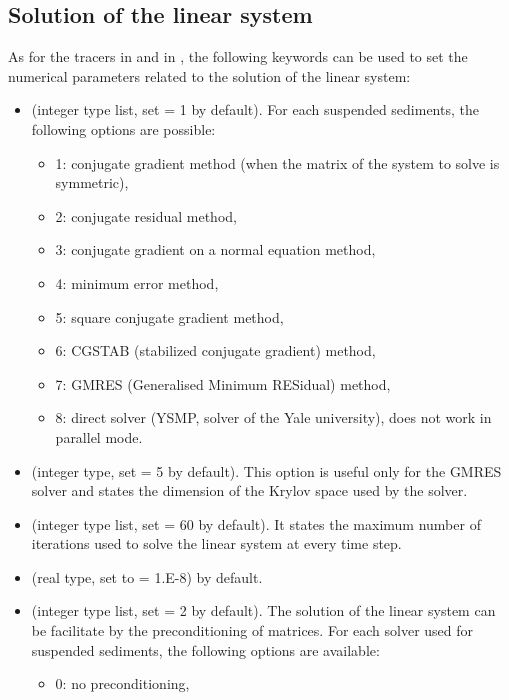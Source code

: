 \subsection{Solution of the linear system}
As for the tracers in  and in , the following
keywords can be used to set the numerical parameters related to the solution
 of the linear system:
\begin{itemize}
\item {} (integer type list, set
{\ttfamily = 1} by default). For each suspended sediments, the following
options are possible:
 \begin{itemize}
\item 1: conjugate gradient method (when the matrix of the system to solve
is symmetric),

\item 2: conjugate residual method,

\item 3: conjugate gradient on a normal equation method,

\item 4: minimum error method,

\item 5: square conjugate gradient method,

\item 6: CGSTAB (stabilized conjugate gradient) method,

\item 7: GMRES (Generalised Minimum RESidual) method,

\item 8: direct solver (YSMP, solver of the Yale university),
does not work in parallel mode.
 \end{itemize}
\item {} (integer type, set
 {\ttfamily = 5} by default). This option is useful only for the GMRES solver
and states the dimension of the Krylov space used by the solver.
\item {} (integer
type list, set {\ttfamily = 60} by default). It states the maximum number of
iterations used to solve the linear system at every time step.
\item {} (real type, set to {\ttfamily
 = 1.E-8}) by default.
\item {} (integer type list, set
{\ttfamily = 2} by default). The solution of the linear system can be facilitate
by the preconditioning of matrices. For each solver used for suspended sediments,
the following options are available:
\begin{itemize}
\item 0:  no preconditioning,


\end{itemize}
\end{itemize}
